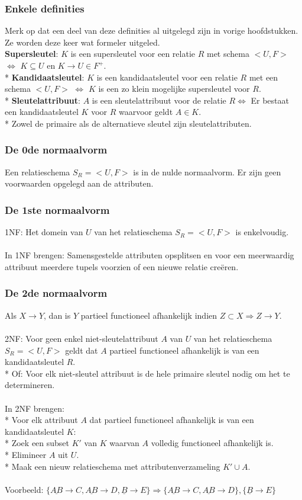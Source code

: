 \documentclass[10pt]{article}
\begin{document}
\subsubsection{Enkele definities}
Merk op dat een deel van deze definities al uitgelegd zijn in vorige hoofdstukken. Ze worden deze keer wat formeler uitgeled.\\
\textbf{Supersleutel}: $K$ is een supersleutel voor een relatie $R$ met schema $<U,F>$ $\Leftrightarrow$ $K \subseteq U$ en $K \rightarrow U \in F^+$.\\*
\textbf{Kandidaatsleutel}: $K$ is een kandidaatsleutel voor een relatie $R$ met een schema $<U,F>$ $\Leftrightarrow$ $K$ is een zo klein mogelijke supersleutel voor $R$.\\*
\textbf{Sleutelattribuut}: $A$ is een sleutelattribuut voor de relatie $R \Leftrightarrow$ Er bestaat een kandidaatsleutel $K$ voor $R$ waarvoor geldt $A \in K$.\\*
Zowel de primaire als de alternatieve sleutel zijn sleutelattributen.
\subsubsection{De 0de normaalvorm}
Een relatieschema $S_R = <U,F>$ is in de nulde normaalvorm. Er zijn geen voorwaarden opgelegd aan de attributen.
\subsubsection{De 1ste normaalvorm}
1NF: Het domein van $U$ van het relatieschema $S_R = <U,F>$ is enkelvoudig.\\\\
In 1NF brengen: Samensgestelde attributen opsplitsen en voor een meerwaardig attribuut meerdere tupels voorzien of een nieuwe relatie cre\"eren.
\subsubsection{De 2de normaalvorm}
Als $X \rightarrow Y$, dan is $Y$ partieel functioneel afhankelijk indien $Z \subset X \Rightarrow Z \rightarrow Y$.\\\\
2NF: Voor geen enkel niet-sleutelattribuut $A$ van $U$ van het relatieschema $S_R = <U,F>$ geldt dat $A$ partieel functioneel afhankelijk is van een kandidaatsleutel $R$.\\*
Of: Voor elk niet-sleutel attribuut is de hele primaire sleutel nodig om het te determineren.\\\\
In 2NF brengen:\\*
Voor elk attribuut $A$ dat partieel functioneel afhankelijk is van een kandidaatsleutel $K$:\\*
Zoek een subset $K'$ van $K$ waarvan $A$ volledig functioneel afhankelijk is.\\*
Elimineer $A$ uit $U$.\\*
Maak een nieuw relatieschema met attributenverzameling $K' \cup A$.\\\\
Voorbeeld: $\{\underline{AB} \rightarrow C, \underline{AB} \rightarrow D, \underline{B} \rightarrow E\} \Rightarrow \{\underline{AB} \rightarrow C, \underline{AB} \rightarrow D\}, \{\underline{B} \rightarrow E\}$
\end{document}
